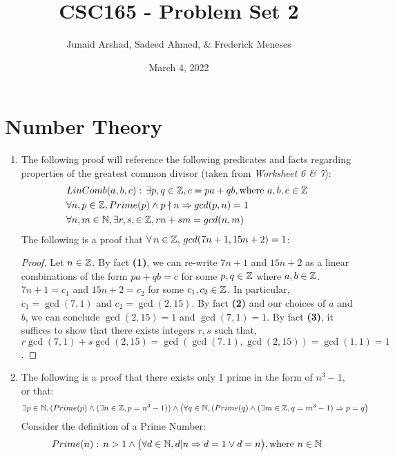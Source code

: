 \documentclass[12pt]{article}
\title{CSC165 - Problem Set 2}
\author{Junaid Arshad, Sadeed Ahmed, \& Frederick Meneses}
\date{March 4, 2022}
\theoremstyle{definition}
\begin{document}
\maketitle

\section{Number Theory}

\begin{enumerate}
    \item The following proof will reference the following predicates and facts regarding properties of the greatest common divisor (taken from \textit{Worksheet 6 \& 7}):
    \begin{align}
        &LinComb(a, b, c) :\, \exists p, q \in \mathbb Z, c = pa + qb, \text{where $a, b, c \in \mathbb Z$}\\
        &\forall n, p \in \mathbb Z, Prime(p) \land p \nmid n \mathrel{\Rightarrow} gcd(p, n) = 1\\
        &\forall n, m \in \mathbb N, \exists r, s, \in \mathbb Z, rn + sm = gcd(n, m)
    \end{align}
    The following is a proof that $\forall\,n \in \mathbb Z,\, gcd(7 n + 1, 15 n + 2) = 1$:
    
        \begin{proof}
            Let $n \in \mathbb Z$. By fact \textbf{(1)}, we can re-write $7n + 1$ and $15n + 2$ as a linear combinations of the form $pa + qb = c$ for some $p, q \in \mathbb Z$ where $a, b \in \mathbb Z$. $7n + 1 = c_1$ and $15n + 2 = c_2$ for some $c_1, c_2 \in \mathbb Z$. In particular, $c_1 = \gcd(7, 1)$ and $c_2 = \gcd(2, 15)$. By fact \textbf{(2)} and our choices of $a$ and $b$, we can conclude $\gcd(2, 15) = 1$ and $\gcd(7, 1) = 1$. By fact \textbf{(3)}, it suffices to show that there exists integers $r, s$ such that, $r\gcd(7, 1) + s\gcd(2, 15) = \gcd(\gcd(7, 1), \gcd(2, 15)) = \gcd(1, 1) = 1$.
            
        \end{proof}
        
    \item The following is a proof that there exists only 1 prime in the form of $n^3 - 1$, or that:
    \begin{align*}
      \exists p \in \mathbb N, (Prime(p) \land (\exists n \in \mathbb Z, p = n^3 - 1)) \land \big(\forall q \in \mathbb N, (Prime(q) \land (\exists m \in \mathbb Z, q = m^3 - 1) \mathrel{\Rightarrow} p = q\big)  
    \end{align*}
    Consider the definition of a Prime Number:
    \begin{align}
        Prime(n) : \, n > 1 \land \big(\forall d \in \mathbb N, d|n \mathrel{\Rightarrow} d=1 \lor d=n\big), \text{where $n \in \mathbb N$}
    \end{align}
    

\end{enumerate}
\end{document}

